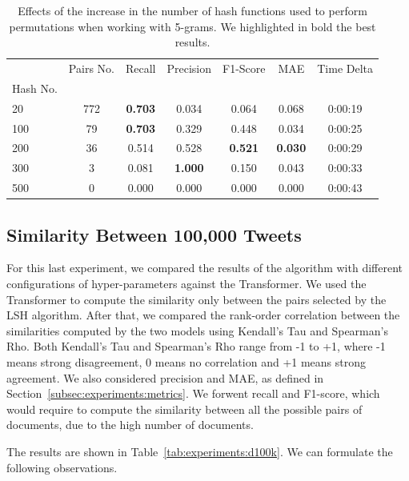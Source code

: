 \documentclass[runningheads]{llncs}
\begin{document}
\begin{table}
  \caption{Effects of the increase in the number of hash functions used to perform permutations when working with 5-grams. We highlighted in bold the best results.}
  \label{tab:experiments:hashes_k5}
  \centering
  \begin{tabular}{lcccccc}
    \toprule
    {} &  Pairs No. &  Recall &  Precision &  F1-Score &    MAE & Time Delta \\
    Hash No. &            &         &            &           &        &            \\
    \midrule
    20       &        772 &   \textbf{0.703} &      0.034 &     0.064 &  0.068 &    0:00:19 \\
    100      &         79 &   \textbf{0.703} &      0.329 &     0.448 &  0.034 &    0:00:25 \\
    200      &         36 &   0.514 &      0.528 &     \textbf{0.521} &  \textbf{0.030} &    0:00:29 \\
    300      &          3 &   0.081 &      \textbf{1.000} &     0.150 &  0.043 &    0:00:33 \\
    500      &          0 &   0.000 &      0.000 &     0.000 &  0.000 &    0:00:43 \\
    \bottomrule
    \end{tabular}
\end{table}

\subsection{Similarity Between 100,000 Tweets}
\label{subsec:experiments:100k}

For this last experiment, we compared the results of the algorithm with different configurations of hyper-parameters against the Transformer. We used the Transformer to compute the similarity only between the pairs selected by the LSH algorithm. After that, we compared the rank-order correlation between the similarities computed by the two models using Kendall's Tau and Spearman's Rho. Both Kendall's Tau and Spearman's Rho range from -1 to +1, where -1 means strong disagreement, 0 means no correlation and +1 means strong agreement. We also considered precision and MAE, as defined in Section~\ref{subsec:experiments:metrics}. We forwent recall and F1-score, which would require to compute the similarity between all the possible pairs of documents, due to the high number of documents.

The results are shown in Table~\ref{tab:experiments:d100k}. We can formulate the following observations.
\end{document}
